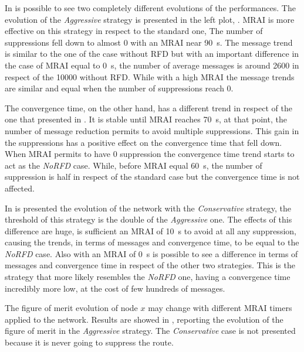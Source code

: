 In  is possible to see two completely different evolutions
of the performances.
The evolution of the \textit{Aggressive} strategy is presented in the left plot,
.
\ac{MRAI} is more effective on this strategy in respect to the standard one,
The number of suppressions fell down to almost \num{0} with an \ac{MRAI} near
\SI{90}{\second}.
The message trend is similar to the one of the case without \ac{RFD} but with an
important difference in the case of  \ac{MRAI} equal to \SI{0}{\second}, the number
of average messages is around \num{2600} in respect of the \num{10000} without
\ac{RFD}.
While with a high \ac{MRAI} the message trends are similar and equal when the number of
suppressions reach \num{0}.

The convergence time, on the other hand, has a different trend in respect of
the one that presented in .
It is stable until \ac{MRAI} reaches \SI{70}{\second}, at that point, the number
of message reduction permits to avoid multiple suppressions.
This gain in the suppressions has a positive effect on the convergence time that
fell down.
When \ac{MRAI} permits to have \num{0} suppression the convergence time trend
starts to act as the \textit{NoRFD} case.
While, before \ac{MRAI} equal \SI{60}{\second}, the number of suppression is half
in respect of the standard case but the convergence time is not affected.

In  is presented the evolution of the network with the
\textit{Conservative} strategy, the threshold of this strategy is the double of
the \textit{Aggressive} one.
The effects of this difference are huge, is sufficient an \ac{MRAI} of \SI{10}{\second}
to avoid at all any suppression, causing the trends, in terms of messages and
convergence time, to be equal to the \textit{No\ac{RFD}} case.
Also with an \ac{MRAI} of \SI{0}{\second} is possible to see a difference in
terms of messages and convergence time in respect of the other two strategies.
This is the strategy that more likely resembles the \textit{NoRFD} one,
having a convergence time incredibly more low, at the cost of few hundreds of messages.

The figure of merit evolution of node \(x\) may change with different \ac{MRAI}
timers applied to the network.
Results are showed in , reporting
the evolution of the figure of merit in the \textit{Aggressive} strategy.
The \textit{Conservative} case is not presented because it is never going to suppress
the route.

